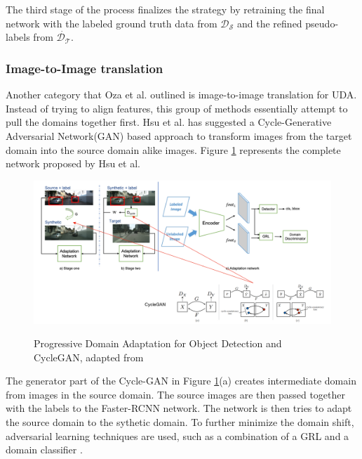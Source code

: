 \documentclass[english, 12pt, a4paper, elec, utf8, a-1b, online]{aaltothesis}
\begin{document}
The third stage of the process finalizes the strategy by retraining the final network with the labeled ground truth data from $\mathcal{D_S}$ and the refined pseudo-labels from $\dot{\mathcal{D_T}}$. 


\subsubsection{Image-to-Image translation}
\label{imagetoimage} 
Another category that Oza et al.\cite{Oza2021} outlined is image-to-image translation for UDA. Instead of trying to align features, this group of methods essentially attempt to pull the domains together first. Hsu et al.\cite{Hsu2019} has suggested a Cycle-Generative Adversarial Network(GAN)\cite{Zhu2017} based approach to transform images from the target domain into the source domain alike images. Figure \ref{gan} represents the complete network proposed by Hsu et al. 

\begin{figure}[htb]
	\begin{center}
		\includegraphics[width=16cm]{./GAN.png}
	\end{center}
	\caption{Progressive Domain Adaptation for Object Detection and CycleGAN, adapted from \cite{Hsu2019}}
	\begin{center}
		\label{gan}
	\end{center}
\end{figure}
\FloatBarrier

The generator part of the Cycle-GAN in Figure \ref{gan}(a) creates intermediate domain from images in the source domain. The source images are then passed together with the labels to the Faster-RCNN network. The network is then tries to adapt the source domain to the sythetic domain. To further minimize the domain shift, adversarial learning techniques are used, such as a combination of a GRL and a domain classifier \cite{Hsu2019}.
\end{document}
